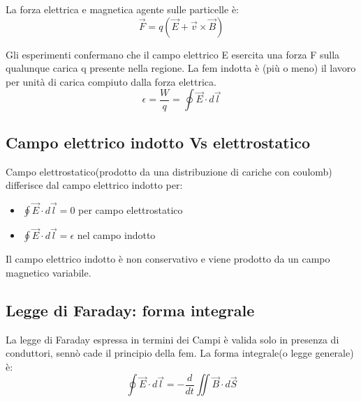 La forza elettrica e magnetica agente sulle particelle è:
\begin{equation}
    \vec{F} = q(\vec{E}+\vec{v}\times\vec{B})
\end{equation}

Gli esperimenti confermano che il campo elettrico E esercita
una forza F sulla qualunque carica q presente nella regione.
La fem indotta è (più o meno) il lavoro per unità di carica
compiuto dalla forza elettrica.
\begin{equation}
    \epsilon = \frac{W}{q} = \oint{\vec{E}\cdot d\vec{l}}
\end{equation}

\subsection{Campo elettrico indotto Vs elettrostatico}
Campo elettrostatico(prodotto da una distribuzione di cariche con coulomb)
differisce dal campo elettrico indotto per:
\begin{itemize}
    \item $\oint{\vec{E}\cdot d\vec{l}} = 0$ per campo elettrostatico
    \item $\oint{\vec{E}\cdot d\vec{l}} = \epsilon$ nel campo indotto
\end{itemize}


Il campo elettrico indotto è non conservativo e viene prodotto
da un campo magnetico variabile.

\subsection{Legge di Faraday: forma integrale}
La legge di Faraday espressa in termini dei Campi è valida 
solo in presenza di conduttori, sennò cade il principio della fem.
La forma integrale(o legge generale) è:
\begin{equation}
    \oint{\vec{E}\cdot d\vec{l}} = 
    -\frac{d}{dt}\iint{\vec{B}\cdot d\vec{S}}
\end{equation}

